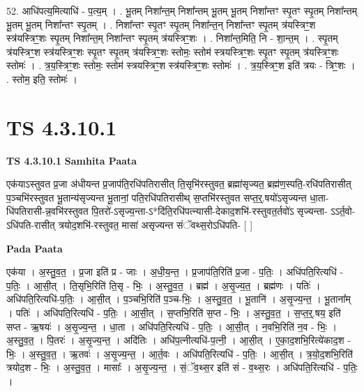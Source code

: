 \documentclass[17pt]{extarticle}
\begin{document}
52. आधि॑पत्य॒मित्याधि॑ - प॒त्य॒म् । . भू॒तम् निशा᳚न्त॒म् निशा᳚न्तम् भू॒तम् भू॒तम् निशा᳚न्तꣳ स्पृ॒तꣳ स्पृ॒तम् निशा᳚न्तम् भू॒तम् भू॒तम् निशा᳚न्तꣳ स्पृ॒तम् । . निशा᳚न्तꣳ स्पृ॒तꣳ स्पृ॒तम् निशा᳚न्त॒न् निशा᳚न्तꣳ स्पृ॒तम् त्र॑यस्त्रिꣳ॒॒श स्त्र॑यस्त्रिꣳ॒॒शः स्पृ॒तम् निशा᳚न्त॒म् निशा᳚न्तꣳ स्पृ॒तम् त्र॑यस्त्रिꣳ॒॒शः । . निशा᳚न्त॒मिति॒ नि - शा॒न्त॒म् । . स्पृ॒तम् त्र॑यस्त्रिꣳ॒॒श स्त्र॑यस्त्रिꣳ॒॒शः स्पृ॒तꣳ स्पृ॒तम् त्र॑यस्त्रिꣳ॒॒शः स्तोमः॒ स्तोम॑ स्त्रयस्त्रिꣳ॒॒शः स्पृ॒तꣳ स्पृ॒तम् त्र॑यस्त्रिꣳ॒॒शः स्तोमः॑ । . त्र॒य॒स्त्रिꣳ॒॒शः स्तोमः॒ स्तोम॑ स्त्रयस्त्रिꣳ॒॒श स्त्र॑यस्त्रिꣳ॒॒शः स्तोमः॑ । . त्र॒य॒स्त्रिꣳ॒॒श इति॑ त्रयः - त्रिꣳ॒॒शः । . स्तोम॒ इति॒ स्तोमः॑ । \newline
\pagebreak
{}

\section{ TS 4.3.10.1 }

\textbf{TS 4.3.10.1 } \newline
\textbf{Samhita Paata} \newline

एक॑याऽस्तुवत प्र॒जा अ॑धीयन्त प्र॒जाप॑ति॒रधि॑पतिरासीत् ति॒सृभि॑रस्तुवत॒ ब्रह्मा॑सृज्यत॒ ब्रह्म॑ण॒स्पति॒-रधि॑पतिरासीत् प॒ञ्चभि॑रस्तुवत भू॒तान्य॑सृज्यन्त भू॒तानां॒ पति॒रधि॑पतिरासीथ् स॒प्तभि॑रस्तुवत सप्त॒र्॒.षयो॑ऽसृज्यन्त धा॒ता-धि॑पतिरासी-न्न॒वभि॑रस्तुवत पि॒तरो॑-ऽसृज्य॒न्ता-ऽ*दि॑ति॒रधि॑पत्न्यासी-देकाद॒शभि॑-रस्तुवत॒र्तवो॑ऽ सृज्यन्ता- ऽऽर्त॒वो-ऽधि॑पति-रासीत् त्रयोद॒शभि॑-रस्तुवत॒ मासा॑ असृज्यन्त संॅवथ्स॒रोऽधि॑पति- [  ] \newline

\textbf{Pada Paata} \newline

एक॑या । अ॒स्तु॒व॒त॒ । प्र॒जा इति॑ प्र - जाः । अ॒धी॒य॒न्त॒ । प्र॒जाप॑ति॒रिति॑ प्र॒जा - प॒तिः॒ । अधि॑पति॒रित्यधि॑ - प॒तिः॒ । आ॒सी॒त् । ति॒सृभि॒रिति॑ ति॒सृ - भिः॒ । अ॒स्तु॒व॒त॒ । ब्रह्म॑ । अ॒सृ॒ज्य॒त॒ । ब्रह्म॑णः । पतिः॑ । अधि॑पति॒रित्यधि॑-प॒तिः॒ । आ॒सी॒त् । प॒ञ्चभि॒रिति॑ प॒ञ्च-भिः॒ । अ॒स्तु॒व॒त॒ । भू॒तानि॑ । अ॒सृ॒ज्य॒न्त॒ । भू॒ताना᳚म् । पतिः॑ । अधि॑पति॒रित्यधि॑ - प॒तिः॒ । आ॒सी॒त् । स॒प्तभि॒रिति॑ स॒प्त - भिः॒ । अ॒स्तु॒व॒त॒ । स॒प्त॒र्॒.षय॒ इति॑ सप्त - ऋ॒षयः॑ । अ॒सृ॒ज्य॒न्त॒ । धा॒ता । अधि॑पति॒रित्यधि॑ - प॒तिः॒ । आ॒सी॒त् । न॒वभि॒रिति॑ न॒व - भिः॒ । अ॒स्तु॒व॒त॒ । पि॒तरः॑ । अ॒सृ॒ज्य॒न्त॒ । अदि॑तिः । अधि॑प॒त्नीत्यधि॑-प॒त्नी॒ । आ॒सी॒त् । ए॒का॒द॒शभि॒रित्ये॑काद॒श - भिः॒ । अ॒स्तु॒व॒त॒ । ऋ॒तवः॑ । अ॒सृ॒ज्य॒न्त॒ । आ॒र्त॒वः । अधि॑पति॒रित्यधि॑ - प॒तिः॒ । आ॒सी॒त् । त्र॒यो॒द॒शभि॒रिति॑ त्रयोद॒श - भिः॒ । अ॒स्तु॒व॒त॒ । मासाः᳚ । अ॒सृ॒ज्य॒न्त॒ । सं॒ॅव॒थ्स॒र इति॑ सं - व॒थ्स॒रः । अधि॑पति॒रित्यधि॑ - प॒तिः॒ ।  \newline
\end{document}
